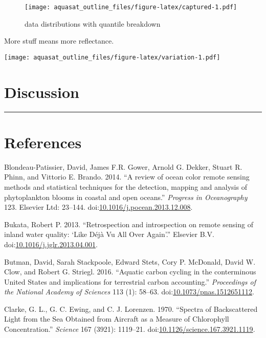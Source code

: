 \documentclass[]{article}
\begin{document}
\begin{figure}
\centering
\texttt{[image: aquasat\_outline\_files/figure-latex/captured-1.pdf]}
\caption{\label{fig:captured} data distributions with quantile
breakdown}
\end{figure}

More stuff means more reflectance.

\texttt{[image: aquasat\_outline\_files/figure-latex/variation-1.pdf]}

\section{Discussion}\label{discussion}

\begin{center}\rule{0.5\linewidth}{\linethickness}\end{center}

\section*{References}\label{references}

\hypertarget{refs}{}
\hypertarget{ref-Blondeau-Patissier2014}{}
Blondeau-Patissier, David, James F.R. Gower, Arnold G. Dekker, Stuart R.
Phinn, and Vittorio E. Brando. 2014. ``A review of ocean color remote
sensing methods and statistical techniques for the detection, mapping
and analysis of phytoplankton blooms in coastal and open oceans.''
\emph{Progress in Oceanography} 123. Elsevier Ltd: 23--144.
doi:\href{https://doi.org/10.1016/j.pocean.2013.12.008}{10.1016/j.pocean.2013.12.008}.

\hypertarget{ref-Bukata2013}{}
Bukata, Robert P. 2013. ``Retrospection and introspection on remote
sensing of inland water quality: `Like Déjà Vu All Over Again'.''
Elsevier B.V.
doi:\href{https://doi.org/10.1016/j.jglr.2013.04.001}{10.1016/j.jglr.2013.04.001}.

\hypertarget{ref-Butman2016}{}
Butman, David, Sarah Stackpoole, Edward Stets, Cory P. McDonald, David
W. Clow, and Robert G. Striegl. 2016. ``Aquatic carbon cycling in the
conterminous United States and implications for terrestrial carbon
accounting.'' \emph{Proceedings of the National Academy of Sciences} 113
(1): 58--63.
doi:\href{https://doi.org/10.1073/pnas.1512651112}{10.1073/pnas.1512651112}.

\hypertarget{ref-Clarke1970}{}
Clarke, G. L., G. C. Ewing, and C. J. Lorenzen. 1970. ``Spectra of
Backscattered Light from the Sea Obtained from Aircraft as a Measure of
Chlorophyll Concentration.'' \emph{Science} 167 (3921): 1119--21.
doi:\href{https://doi.org/10.1126/science.167.3921.1119}{10.1126/science.167.3921.1119}.
\end{document}
